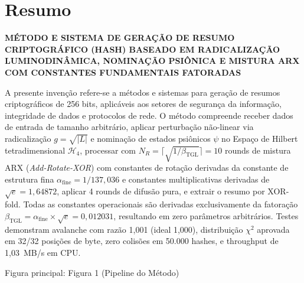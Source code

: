 \documentclass[12pt,a4paper]{article}
\newcommand{\betatgl}{\beta_{\!\scriptscriptstyle\mathrm{TGL}}}
\newcommand{\afine}{\alpha_{\mathrm{fine}}}
\begin{document}

\newpage
\section*{Resumo}

\textbf{MÉTODO E SISTEMA DE GERAÇÃO DE RESUMO CRIPTOGRÁFICO (HASH) BASEADO EM RADICALIZAÇÃO LUMINODINÂMICA, NOMINAÇÃO PSIÔNICA E MISTURA ARX COM CONSTANTES FUNDAMENTAIS FATORADAS}

\medskip

A presente invenção refere-se a métodos e sistemas para geração de resumos criptográficos de 256 bits, aplicáveis aos setores de segurança da informação, integridade de dados e protocolos de rede. O método compreende receber dados de entrada de tamanho arbitrário, aplicar perturbação não-linear via radicalização $g = \sqrt{|L|}$ e nominação de estados psiônicos $\psi$ no Espaço de Hilbert tetradimensional $\mathcal{H}_4$, processar com $N_R = \lceil\sqrt{1/\betatgl}\rceil = 10$ rounds de mistura ARX (\textit{Add-Rotate-XOR}) com constantes de rotação derivadas da constante de estrutura fina $\afine = 1/137{,}036$ e constantes multiplicativas derivadas de $\sqrt{e} = 1{,}64872$, aplicar 4 rounds de difusão pura, e extrair o resumo por XOR-fold. Todas as constantes operacionais são derivadas exclusivamente da fatoração $\betatgl = \afine \times \sqrt{e} = 0{,}012031$, resultando em zero parâmetros arbitrários. Testes demonstram avalanche com razão 1,001 (ideal 1,000), distribuição $\chi^2$ aprovada em 32/32 posições de byte, zero colisões em 50.000 hashes, e throughput de 1,03~MB/s em CPU.

\medskip
\noindent Figura principal: Figura 1 (Pipeline do Método)
\end{document}
